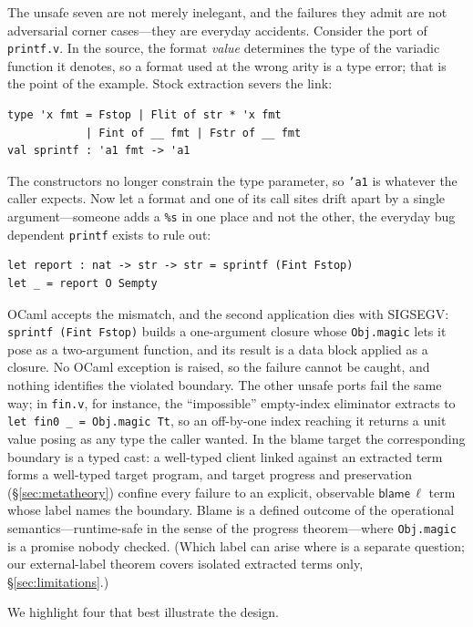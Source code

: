 \documentclass[acmsmall,anonymous=false,nonacm]{acmart}
\newcommand{\blame}[1]{\mathsf{blame}\,#1}
\begin{document}
The unsafe seven are not merely inelegant, and the failures they admit are
not adversarial corner cases---they are everyday accidents.  Consider the
port of \texttt{printf.v}.  In the source, the format \emph{value} determines
the type of the variadic function it denotes, so a format used at the wrong
arity is a type error; that is the point of the example.  Stock extraction
severs the link:
\begin{lstlisting}[language={}]
type 'x fmt = Fstop | Flit of str * 'x fmt
            | Fint of __ fmt | Fstr of __ fmt
val sprintf : 'a1 fmt -> 'a1
\end{lstlisting}
The constructors no longer constrain the type parameter, so \texttt{'a1} is
whatever the caller expects.  Now let a format and one of its call sites
drift apart by a single argument---someone adds a \texttt{\%s} in one place
and not the other, the everyday bug dependent \texttt{printf} exists to rule
out:
\begin{lstlisting}[language={}]
let report : nat -> str -> str = sprintf (Fint Fstop)
let _ = report O Sempty
\end{lstlisting}
OCaml accepts the mismatch, and the second application dies with SIGSEGV:
\texttt{sprintf (Fint Fstop)} builds a one-argument closure whose
\texttt{Obj.magic} lets it pose as a two-argument function, and its result
is a data block applied as a closure.  No OCaml exception is raised, so the
failure cannot be caught, and nothing identifies the violated boundary.  The
other unsafe ports fail the same way; in \texttt{fin.v}, for instance, the
``impossible'' empty-index eliminator extracts to
\texttt{let fin0 \_ = Obj.magic Tt}, so an off-by-one index reaching it
returns a unit value posing as any type the caller wanted.  In the blame target the corresponding boundary is a typed
cast: a well-typed client linked against an extracted term forms a well-typed
target program, and target progress and preservation
(\S\ref{sec:metatheory}) confine every failure to an explicit, observable
$\blame{\ell}$ term whose label names the boundary.  Blame is a defined
outcome of the operational semantics---runtime-safe in the sense of the
progress theorem---where \texttt{Obj.magic} is a promise nobody checked.
(Which label can arise where is a separate question; our external-label
theorem covers isolated extracted terms only, \S\ref{sec:limitations}.)

We highlight four that best illustrate the design.
\end{document}

